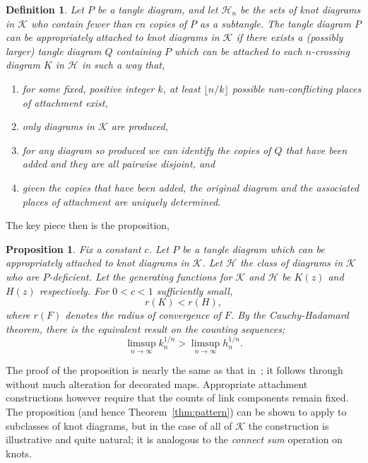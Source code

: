 \documentclass[submission%
]{dmtcs}
\newcommand{\KnotDiaClass}{\mathscr{K}}
\newcommand{\KnotDiaGF}{K}
\newcommand{\KnotDiaCard}{k}
\newtheorem{proposition}{Proposition}
\newtheorem*{definition}{Definition}
\begin{document}
\begin{definition}
  Let $P$ be a tangle diagram, and let $\mathscr{H}_n$ be the sets of
  knot diagrams in $\KnotDiaClass$ who contain fewer than $cn$ copies
  of $P$ as a subtangle. The tangle diagram $P$ can be
  \emph{appropriately attached} to knot diagrams in $\KnotDiaClass$ if
  there exists a (possibly larger) tangle diagram $Q$ containing $P$
  which can be attached to each $n$-crossing diagram $K$ in
  $\mathscr{H}$ in such a way that,
  \begin{enumerate}
  \item for some fixed, positive integer $k$, at least
    $\lfloor n/k \rfloor$ possible non-conflicting places of
    attachment exist,
  \item only diagrams in $\KnotDiaClass$ are produced,
  \item for any diagram so produced we can identify the copies of
    $Q$ that have been added and they are all pairwise disjoint, and
  \item given the copies that have been added, the original diagram
    and the associated places of attachment are uniquely determined.
  \end{enumerate}
\end{definition}
The key piece then is the proposition,

\begin{proposition}
  Fix a constant $c$. Let $P$ be a tangle diagram which can be
  appropriately attached to knot diagrams in $\KnotDiaClass$. Let
  $\mathscr{H}$ the class of diagrams in $\KnotDiaClass$ who are
  $P$-deficient. Let the generating functions for
  $\KnotDiaClass$ and $\mathscr{H}$ be $\KnotDiaGF(z)$ and $H(z)$
  respectively. For $0 < c < 1$ sufficiently small,
  \begin{displaymath}
    r(\KnotDiaGF) < r(H),
  \end{displaymath}
  where $r(F)$ denotes the radius of convergence of $F$. By the
  Cauchy-Hadamard theorem, there is the equivalent result on the
  counting sequences;
  \begin{displaymath}
    \limsup_{n\to\infty}{\KnotDiaCard_n^{1/n}} > \limsup_{n\to\infty}{h_n^{1/n}}.
  \end{displaymath}
\end{proposition}

The proof of the proposition is nearly the same as that
in~\cite{Bender1992104}; it follows through without much alteration
for decorated maps. Appropriate attachment constructions however
require that the counts of link components remain fixed. The
proposition (and hence Theorem~\ref{thm:pattern}) can be shown to
apply to subclasses of knot diagrams, but in the case of all of
$\KnotDiaClass$ the construction is illustrative and quite natural; it
is analogous to the \emph{connect sum} operation on knots.
\end{document}
